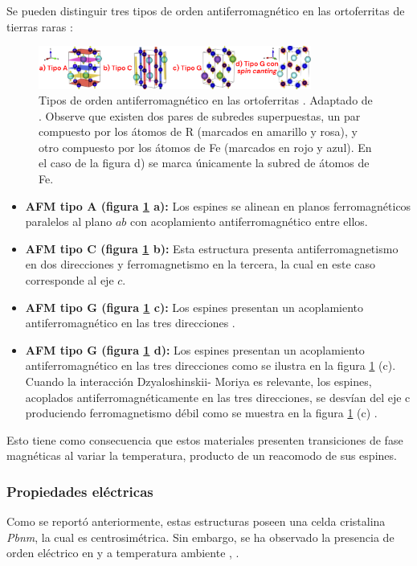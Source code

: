 \documentclass[../main.tex]{subfiles}
\begin{document}
Se pueden distinguir tres tipos de orden antiferromagnético en las ortoferritas de tierras raras \cite{KamalWarshi2018}:
\begin{figure}[H]
    \centering
    \includegraphics[width=0.8\textwidth]{fig/tiposAFM.png}
    \caption{Tipos de orden antiferromagnético en las ortoferritas . Adaptado de \cite{Wang2019}. Observe que existen dos pares de subredes superpuestas, un par compuesto por los átomos de R (marcados en amarillo y rosa), y otro compuesto por los átomos de Fe (marcados en rojo y azul). En el caso de la figura d) se marca únicamente la subred de átomos de Fe.}
    \label{fig:tiposAFM}
\end{figure}
\begin{itemize}
    \item \textbf{AFM tipo A (figura \ref{fig:tiposAFM} a):} Los espines se alinean en planos ferromagnéticos paralelos al plano $ab$ con acoplamiento antiferromagnético entre ellos.
    \item \textbf{AFM tipo C (figura \ref{fig:tiposAFM} b):} Esta estructura presenta antiferromagnetismo en dos direcciones y ferromagnetismo en la tercera, la cual en este caso corresponde al eje $c$.
    \item \textbf{AFM tipo G (figura \ref{fig:tiposAFM} c):} Los espines presentan un acoplamiento antiferromagnético en las tres direcciones \cite{Dagotto}.
    \item \textbf{AFM tipo G (figura \ref{fig:tiposAFM} d):} Los espines presentan un acoplamiento antiferromagnético en las tres
    direcciones como se ilustra en la figura \ref{fig:tiposAFM} (c). Cuando la interacción Dzyaloshinskii-
    Moriya es relevante, los espines, acoplados antiferromagnéticamente en las tres direcciones, se desvían del eje c produciendo ferromagnetismo débil como se muestra en la figura \ref{fig:tiposAFM} (c) \cite{Wang2019}.
\end{itemize}
Esto tiene como consecuencia que estos materiales presenten transiciones de fase magnéticas al variar la temperatura, producto de un reacomodo de sus espines.

\subsubsection{Propiedades eléctricas}
Como se reportó anteriormente, estas estructuras poseen una celda cristalina \textit{Pbnm}, la cual es centrosimétrica. Sin embargo, se ha observado la presencia de orden eléctrico en \sama{} y \neod{} a temperatura ambiente \cite{Rajaitha2022}, \cite{Zhang2016}.
\end{document}
